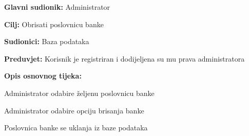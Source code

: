 			
			\noindent {}
			\begin{packed_item}
				
				\item \textbf{Glavni sudionik: }Administrator
				\item  \textbf{Cilj:} Obrisati poslovnicu banke
				\item  \textbf{Sudionici:} Baza podataka
				\item  \textbf{Preduvjet:} Korisnik je registriran i dodijeljena su mu prava administratora
				\item  \textbf{Opis osnovnog tijeka:}
				
				\item[] \begin{packed_enum}
					
					\item Administrator odabire željenu poslovnicu banke
					\item Administrator odabire opciju brisanja banke
					\item Poslovnica banke se uklanja iz baze podataka
					
					
				\end{packed_enum}
				
			\end{packed_item}
		
